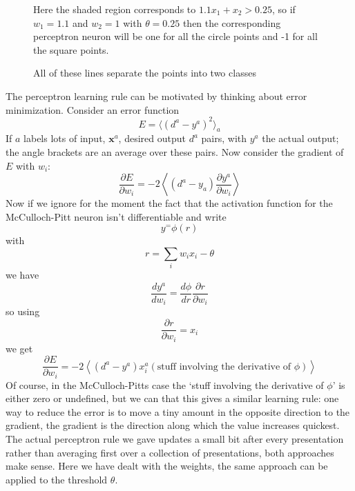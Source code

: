 \documentclass[12pt]{article}
\begin{document}
\begin{figure}

\caption{Here the shaded region corresponds to $1.1x_1+x_2>0.25$, so
  if $w_1=1.1$ and $w_2=1$ with $\theta=0.25$ then the corresponding
  perceptron neuron will be one for all the circle points and -1 for
  all the square points.\label{fig:linear_classifier}}
\end{figure}


\begin{figure}

\caption{All of these lines separate the points into two classes\label{fig:random_points}}
\end{figure}

The perceptron learning rule can be motivated by thinking about error
minimization. Consider an error function
\begin{equation}
E=\langle(d^a-y^a)^2\rangle_a
\end{equation}
If $a$ labels lots of input, $\textbf{x}^a$, desired output $d^a$
pairs, with $y^a$ the actual output; the angle brackets are an average
over these pairs. Now consider the gradient of $E$ with $w_{i}$:
\begin{equation}
\frac{\partial E}{\partial w_{i}}=-2\left\langle (d^a-y_a) \frac{\partial y^a}{\partial w_{i}}\right\rangle
\end{equation}
Now if we ignore for the moment the fact that the activation function for the McCulloch-Pitt neuron isn't differentiable and write
\begin{equation}
y^=\phi(r)
\end{equation}
with 
\begin{equation}
r=\sum_{i}w_i x_i-\theta
\end{equation}
we have
\begin{equation}
\frac{dy^a}{dw_i}=\frac{d\phi}{dr}\frac{\partial r}{\partial w_i}
\end{equation}
so using
\begin{equation}
\frac{\partial r}{\partial w_i}=x_i
\end{equation}
we get
\begin{equation}
\frac{\partial E}{\partial w_{i}}=-2\left\langle (d^a-y^a)x^a_i (\mbox{stuff involving the derivative of }\phi)\right\rangle
\end{equation}
Of course, in the McCulloch-Pitts case the \lq{}stuff involving the
derivative of $\phi$\rq{} is either zero or undefined, but we can that
this gives a similar learning rule: one way to reduce the error is to
move a tiny amount in the opposite direction to the gradient, the
gradient is the direction along which the value increases
quickest. The actual perceptron rule we gave updates a small bit after
every presentation rather than averaging first over a collection of
presentations, both approaches make sense. Here we have dealt with the
weights, the same approach can be applied to the threshold $\theta$.
\end{document}
